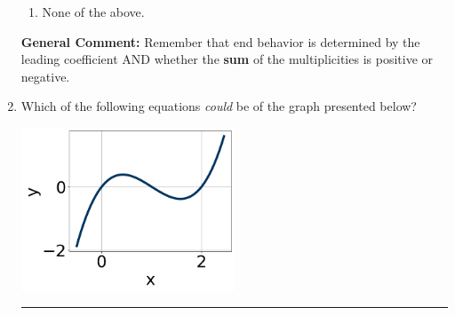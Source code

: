 \documentclass{extbook}[14pt]
\newcommand{\litem}[1]{\item #1

\rule{\textwidth}{0.4pt}}
\begin{document}
\begin{enumerate}
{\begin{enumerate}[label=\Alph*.]
\item None of the above.\end{enumerate}
\textbf{General Comment:} Remember that end behavior is determined by the leading coefficient AND whether the \textbf{sum} of the multiplicities is positive or negative.
}
\litem{
Which of the following equations \textit{could} be of the graph presented below?

\begin{center}
    \includegraphics[width=0.5\textwidth]{../Figures/polyGraphToFunctionCopyB.png}
\end{center}


}
\end{enumerate}
\end{document}
